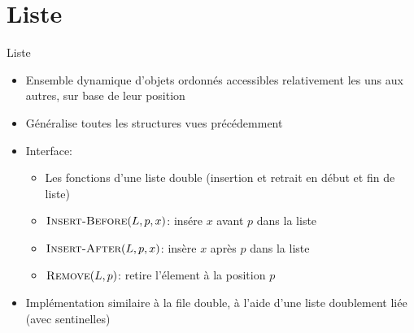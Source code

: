 \section{Liste}

\begin{frame}{Liste}

\begin{itemize}
\item Ensemble dynamique d'objets ordonnés accessibles \alert{relativement}
  les uns aux autres, sur base de leur position
\item Généralise toutes les structures vues précédemment
\item Interface:
\begin{itemize}
\item Les fonctions d'une liste double (insertion et retrait en début et fin de liste)
\item $\textnormal{\scshape Insert-Before}(L,p,x)$: insére $x$ avant $p$ dans la liste
\item $\textnormal{\scshape Insert-After}(L,p,x)$: insère $x$ après $p$ dans la liste
\item $\textnormal{\scshape Remove}(L,p)$: retire l'élement à la position $p$
\end{itemize}

\bigskip

\item Implémentation similaire à la file double, à l'aide d'une liste doublement liée (avec sentinelles)
\end{itemize}

\end{frame}

